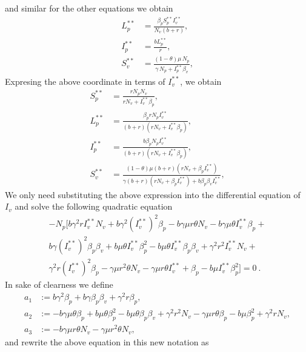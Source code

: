 %
 and similar for the other equations we obtain
\begin{equation*}
	\begin{aligned}
		L^{**}_p &= \frac{\beta_{{p}}S_p^{**} I_v^{**}}{N_{{v}} \left( b+r \right)},
		\\
		I^{**}_p &=\frac{b L^{**}_p}{r},
		\\
		S^{**}_v &=
			\frac{
				\left( 
					1-\theta 
				\right) 
				\mu\, N_{p}
			}{
				\gamma\, N_{p} + I^{**}_ p
				\beta_{v}
			},
	\end{aligned}
\end{equation*}
%
Expresing the above coordinate in terms of $I^{**}_v$, we obtain
%
%
\begin{equation*}
	\begin{aligned}
	S^{**}_p &= 
		\frac{
			r N_p N_v
		}{
			r N_v + 
			I^{**}_v 
			\beta_p
		},
	\\
	L^{**}_p &= 
		\frac{
			\beta_p rN_p I^{**}_v
		}{
			\left( 
				b + r 
			\right)
			(
				r N_v + I_v^{**} 
				\beta_p
			)
		},
%
%
	\\
	I^{**}_p &=
		\frac{
			b \beta_p N_p I_v^{**}
		}{
			 \left(
			 	 b + r 
			 \right)
			 ( r N_v + 
			 	I_v^{**} \beta_p
			 )
		},
	\\
	S^{**}_v &=
		\frac{
			 \left( 
			 	1 - \theta 
			 \right)
			 \mu(b + r)
			 (rN_v + \beta_p I_v^{**})
		}{
			\gamma(b + r)
			(r N_v + \beta_p I^{**}_v) + 
			b \beta_p \beta_v I_v^{**}
		},
	\end{aligned}
\end{equation*}
%
%
We only need substituting the above expression into the differential equation 
of $I_v$ and solve the following quadratic equation
%
	\begin{multline}
		-N_p [ 
			b \gamma^2 r I^{**}_v N_v +
			b \gamma^2 (I^{**}_v)^2 \beta_p -
			b \gamma \mu r \theta N_v - 
			b \gamma \mu \theta I^{**}_v \beta_p + 
			\\
			b \gamma (I^{**}_v)^2 \beta_p \beta_v + 
			b \mu \theta I^{**}_v \beta_p ^ 2
			-
			b \mu \theta I^{**}_v \beta_p \beta_v +
			\gamma^2 r^2 I^{**}_v N_v +
			\\
			\gamma^2 r (I ^{**}_v) ^ 2 \beta_p - 
			\gamma\mu r^2 \theta N_v - 
			\gamma\mu r \theta I^{**}_v +
			\beta_p - b\mu I^{**}_v \beta_p^2
		] = 0 \ .
	\end{multline}
% 
In sake of clearness we define 
\begin{align*}
	a_1 &:= 
		b \gamma^2 \beta_p + 
		b \gamma \beta_p \beta_v + 
		\gamma^2 r \beta_p
		,\\
	a_2 &:=-b \gamma \mu \theta \beta_p + 
		b \mu \theta \beta_p ^ 2 - 
		b \mu \theta \beta_p \beta_v + 
		\gamma^2 r^2 N_v - 
		\gamma \mu r 
		\theta \beta_p - 
		b \mu \beta_p^ 2 + 
		\gamma ^ 2 r N_v,
	\\
	a_3 &:=-b\gamma\mu r\theta N_v-\gamma\mu r^2\theta N_v, 
\end{align*}
%
and rewrite the above equation in this new notation as

